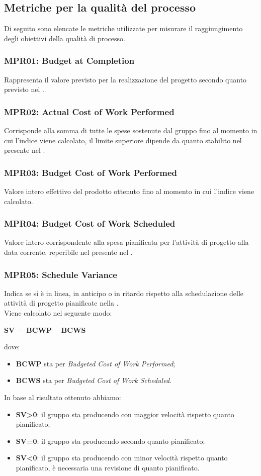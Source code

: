 \subsection{Metriche per la qualità del processo}
Di seguito sono elencate le metriche utilizzate per misurare il raggiungimento degli obiettivi della qualità di processo.
\subsubsection{MPR01: Budget at Completion}
Rappresenta il valore previsto per la realizzazione del progetto secondo quanto previsto nel .
\subsubsection{MPR02: Actual Cost of Work Performed}
Corrisponde alla somma di tutte le spese sostenute dal gruppo fino al momento in cui l'indice viene calcolato, il limite superiore dipende da quanto stabilito nel  presente nel .
\subsubsection{MPR03: Budget Cost of Work Performed}
Valore intero effettivo del prodotto ottenuto fino al momento in cui l'indice viene calcolato.
\subsubsection{MPR04: Budget Cost of Work Scheduled}
Valore intero corrispondente alla spesa pianificata per l'attività di progetto alla data corrente, reperibile nel  presente nel .
\subsubsection{MPR05: Schedule Variance}
Indica se si è in linea, in anticipo o in ritardo rispetto alla schedulazione delle attività di progetto pianificate nella .\\
Viene calcolato nel seguente modo:
\begin{center}
	\textbf{SV = BCWP – BCWS}
\end{center}
dove: 
\begin{itemize}
	\item \textbf{BCWP} sta per \textit{Budgeted Cost of Work Performed};
	\item \textbf{BCWS} sta per \textit{Budgeted Cost of Work Scheduled}.
\end{itemize}
In base al risultato ottenuto abbiamo:
\begin{itemize}
	\item \textbf{SV>0}: il gruppo sta producendo con maggior velocità rispetto quanto pianificato;
	\item \textbf{SV=0}: il gruppo sta producendo secondo quanto pianificato;
	\item \textbf{SV<0}: il gruppo sta producendo con minor velocità rispetto quanto pianificato, è necessaria una revisione di quanto pianificato.
\end{itemize}
